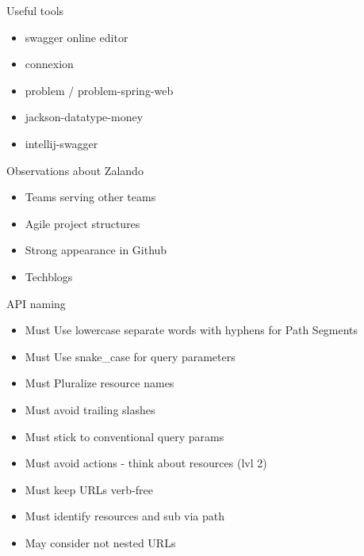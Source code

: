 \documentclass[10pt]{beamer}
\begin{document}
\begin{frame}{Useful tools}

  \begin{itemize}

    \item
          swagger online editor
    \item
          connexion
    \item
          problem / problem-spring-web
    \item
          jackson-datatype-money
    \item
          intellij-swagger
  \end{itemize}

\end{frame}

\begin{frame}{Observations about Zalando}

  \begin{itemize}

    \item
          Teams serving other teams
    \item
          Agile project structures
    \item
          Strong appearance in Github
    \item
          Techblogs
  \end{itemize}

\end{frame}

\begin{frame}{API naming}

  \begin{itemize}

    \item
          Must Use lowercase separate words with hyphens for Path Segments
    \item
          Must Use snake\_case for query parameters
    \item
          Must Pluralize resource names
    \item
          Must avoid trailing slashes
    \item
          Must stick to conventional query params
    \item
          Must avoid actions - think about resources (lvl 2)
    \item
          Must keep URLs verb-free
    \item
          Must identify resources and sub via path
    \item
          May consider not nested URLs
  \end{itemize}

\end{frame}
\end{document}
